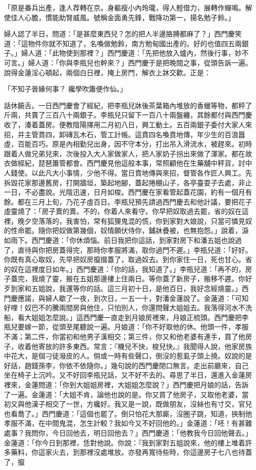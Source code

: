 「原是番兵出產，逢人荐轉在京。身軀瘦小內玲瓏，得人輕借力，展轉作蟬鳴。解使佳人心膽，慣能助腎威風。號稱金面勇先鋒，戰降功第一，揚名勉子鈴。」

婦人認了半日，問道：「是甚麼東西兒？怎的把人半邊胳膊都麻了？」西門慶笑道：「這物件你就不知道了，名喚做勉鈴，南方勉甸國出產的。好的也值四五兩銀子。」婦人道：「此物使到那裡？」西門慶道：「先把他放入爐內，然後行事，妙不可言。」婦人道：「你與李瓶兒也幹來？」西門慶于是把晚間之事，從頭告訴一遍。說得金蓮淫心頓起，兩個白日裡，掩上房門，解衣上牀交歡。正是：

「不知子晉緣何事？  纔學吹簫便作仙。」

話休饒舌。一日西門慶會了經紀，把李瓶兒牀後茶葉箱內堆放的香蠟等物，都秤了斤兩，共賣了三百八十兩銀子。李瓶兒只留下一百八十兩盤纏，其餘都付與西門慶收了，湊着蓋房。便教陰陽擇用二月初八日，興工動土。五百兩銀子委付大家人來招，并主管賁四，卸磚瓦木石，管工計帳。這賁四名喚賁地傳，年少生的百浪囂虛，百能百巧。原是內相勤兒出身，因不守本分，打出吊入滑流水，被趕來。初時跟着人做兄弟兒來，次後投入大人家做家人，把人家奶子拐出來做了渾家。都在故衣做經紀，琵琶簫管都會。西門慶見他這般本事，常照顧他在生藥舖中秤貨，討中人錢使。以此凡大小事情，少他不得。當日賁地傳與來招，督管各作匠人興工。先拆毀花家那邊舊房，打開牆垣，築起地腳，蓋起捲棚山子，各亭臺耍子去處，非止一日，不必盡說。光陰迅速，日月如梭。西門慶在家看管起蓋花園，約有一個月有餘。都在三月上旬，乃花子虛百日。李瓶兒預先請過西門慶去和他計議，要把花子虛靈燒了：「房子賣的賣。不的，你着人來看守。你早把奴取過去罷，省的奴在這裡，晚夕空落落的，我害怕，常有狐狸鬼混的慌，你到家對大娘說，只當可憐見奴的性命罷。隨你把奴做第幾個，奴情願伏侍你，鋪牀疊被，也無抱怨。」說着，淚如雨下。西門慶道：「你休煩惱。前日我把你這話，到家對房下和潘五姐也說過了，直待與你把房蓋得完，那時你孝服將滿，取你過門不遲。」李瓶兒道：「好好。你既有真心取奴，先早把奴房攛掇蓋了，取過奴去。到你家住一日，死也甘心。省的奴在這裡度日如年。」西門慶道：「你的話，我知道了。」李瓶兒道：「再不的，房子蓋完，我燒了靈，搬在五姐那邊樓上住兩日。等你蓋了新房子，搬移不遲。你好歹到家和五姐說，我還等你的話。這三月初十日，是他百日，我好念經燒靈。」西門慶應諾，與婦人歇了一夜，到次日，一五一十，對潘金蓮說了。金蓮道：「可知好哩！奴巴不的騰兩間房與他住，只怕別人，你還問聲大姐姐去。我落得河水不洗船，看大姐姐怎麼說。」這西門慶一直走到月娘房裡來，月娘正梳頭。西門慶把李瓶兒要嫁一節，從頭至尾聽說一遍。月娘道：「你不好取他的休。他頭一件，孝服不滿；第二件，你當初和他男子漢相交；第三件，你又和他老婆有連手，買了他房子，收着他寄放的許多東西。常言：『機兒不快，梭兒快。』我聞得人說，他家房族中花大，是個刁徒潑皮的人。倘或一時有些聲口，倒沒的惹虱子頭上撓。奴說的是好話，趙錢孫李，你依不依隨你。」幾句說的西門慶閉口無言。走出前廳來，自己坐在椅子上沉吟。又不好回李瓶兒話，又不好不去的。尋思了半日，還進入金蓮房裡來，金蓮問道：「你到大姐姐房裡，大姐姐怎麼說？」西門慶把月娘的話，告訴了一遍。金蓮道：「大姐不肯，論他也說的是。你又買了他房子，又取他老婆，當初又與他漢子相交了一世，方纔好。我又是一說，既做朋友，沒絲也有寸交，官兒也看喬了。」西門慶道：「這個也罷了。倒只怕花大那廝，沒圈子跳，知道，挾制他孝服不滿，在中間鬼混，怎生計較？我如今又不好回他的。」金蓮道：「呸！有甚難處事？我問你，今日回他去，明日回他去？」西門慶道：「他教我今日回他聲去。」金蓮道：「你今日到那裡，恁對他說。你說：『我到家對五姐說來，他的樓上堆着許多藥料，你這家火去，到那裡沒處堆放。亦發再寬待些時，你這邊房子七八也待蓋了，攛